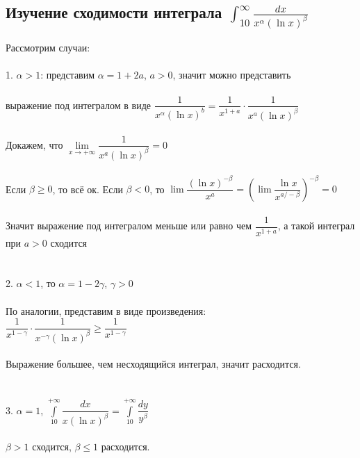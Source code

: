 \documentclass[../main.tex]{subfiles}
\begin{document}
\subsection{Изучение сходимости интеграла $\int_{10}^\infty \frac{dx}{x^\alpha (\ln x)^\beta}$}
Рассмотрим случаи:\\\\
1. $\alpha > 1$: представим $\alpha = 1 + 2a$, $a > 0$, значит можно представить\\\\
выражение под интегралом в виде $\dfrac{1}{x^{\alpha} (\ln {x})^b} = \dfrac{1}{x^{1 + a}} \cdot \dfrac{1}{x^a(\ln{x})^{\beta}}$\\\\
Докажем, что $\lim\limits_{x \rightarrow +\infty} \dfrac{1}{x^a (\ln{x})^{\beta}} = 0$\\\\
Если $\beta \geq 0$, то всё ок. Если $\beta < 0$, то $\lim \dfrac{(\ln{x})^{-\beta}}{x^a} = \left( \lim \dfrac{\ln{x}}{x^{a / -\beta}} \right)^{-\beta} = 0$\\\\
Значит выражение под интегралом меньше или равно чем $\dfrac{1}{x^{1 + a}}$, а такой интеграл при $a > 0$ сходится\\\\\\
2. $\alpha < 1$, то $\alpha = 1 - 2 \gamma$, $\gamma > 0$\\\\
По аналогии, представим в виде произведения:\\
$\dfrac{1}{x^{1 - \gamma}} \cdot \dfrac{1}{x^{-\gamma}(\ln{x})^{\beta}} \geq \dfrac{1}{x^{1 - \gamma}}$\\\\
Выражение большее, чем несходящийся интеграл, значит расходится.\\\\\\
3. $\alpha = 1$, $\int\limits^{+\infty}_{10} \dfrac{dx}{x(\ln{x})^{\beta}} = \int\limits^{+\infty}_{10} \dfrac{dy}{y^{\beta}}$\\\\
$\beta > 1$ сходится, $\beta \leq 1$ расходится.\\\\\\\\

\newpage
\end{document}

